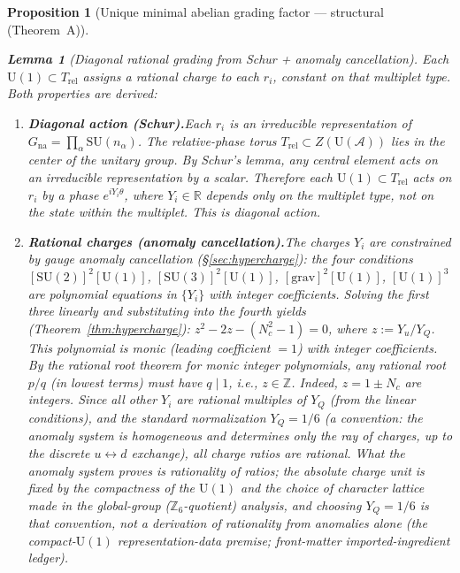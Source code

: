 \documentclass[11pt]{article}
\newtheorem{lemma}[theorem]{Lemma}
\newtheorem{proposition}[theorem]{Proposition}
\theoremstyle{definition}
\newcommand{\SU}{\mathrm{SU}}
\newcommand{\U}{\mathrm{U}}
\begin{document}
\begin{proposition}[Unique minimal abelian grading factor ---
structural (Theorem~A)]
\begin{lemma}[Diagonal rational grading from Schur + anomaly cancellation]
\label{lem:A3_derived}
Each $\U(1) \subset T_{\mathrm{rel}}$ assigns a rational charge to each
$r_i$, constant on that multiplet type.  Both properties are derived:
\begin{enumerate}[label=(\alph*),nosep]
  \item \textbf{Diagonal action (Schur).}\quad Each $r_i$ is an
  irreducible representation of $G_{\mathrm{na}} = \prod_\alpha
  \SU(n_\alpha)$.  The relative-phase torus
  $T_{\mathrm{rel}} \subset Z(\mathrm{U}(\mathcal{A}))$ lies in the
  center of the unitary group.  By Schur's lemma, any central element
  acts on an irreducible representation by a scalar.  Therefore each
  $\U(1) \subset T_{\mathrm{rel}}$ acts on $r_i$ by a phase
  $e^{i Y_i \theta}$, where $Y_i \in \mathbb{R}$ depends only on the
  multiplet type, not on the state within the multiplet.  This is
  diagonal action.
  \item \textbf{Rational charges (anomaly cancellation).}\quad The
  charges $Y_i$ are constrained by gauge anomaly cancellation
  (\S\ref{sec:hypercharge}): the four conditions
  $[\SU(2)]^2[\U(1)]$, $[\SU(3)]^2[\U(1)]$,
  $[\mathrm{grav}]^2[\U(1)]$, $[\U(1)]^3$ are polynomial equations
  in $\{Y_i\}$ with integer coefficients.  Solving the first three
  linearly and substituting into the fourth yields
  (Theorem~\ref{thm:hypercharge}):
  $z^2 - 2z - (N_c^2 - 1) = 0$, where $z := Y_u / Y_Q$.
  This polynomial is \emph{monic} (leading coefficient $= 1$) with
  integer coefficients.  By the rational root theorem for monic
  integer polynomials, any rational root $p/q$ (in lowest terms)
  must have $q \mid 1$, i.e., $z \in \mathbb{Z}$.  Indeed,
  $z = 1 \pm N_c$ are integers.  Since all other $Y_i$ are rational
  multiples of $Y_Q$ (from the linear conditions), and the standard
  normalization $Y_Q = 1/6$ (a \emph{convention}: the anomaly system
  is homogeneous and determines only the ray of charges, up to the
  discrete $u \leftrightarrow d$ exchange), all charge \emph{ratios}
  are rational.  What the anomaly system proves is rationality of
  ratios; the absolute charge unit is fixed by the compactness of the
  $\U(1)$ and the choice of character lattice made in the global-group
  ($\mathbb{Z}_6$-quotient) analysis, and choosing $Y_Q = 1/6$ is that
  convention, not a derivation of rationality from anomalies alone
  (the compact-$\U(1)$ representation-data premise; front-matter
  imported-ingredient ledger).
\end{enumerate}
\end{lemma}


\end{proposition}
\end{document}
